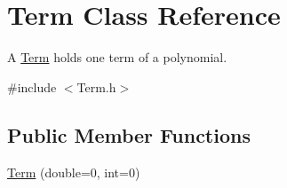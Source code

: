 \hypertarget{classTerm}{\section{Term Class Reference}
\label{classTerm}
}


A \hyperlink{classTerm}{Term} holds one term of a polynomial.  




{\ttfamily \#include $<$Term.\-h$>$}

\subsection*{Public Member Functions}
\begin{DoxyCompactItemize}
\item 
\hypertarget{classTerm_aa72ef129269040b50836346dcae32154}{\hyperlink{classTerm_aa72ef129269040b50836346dcae32154}{Term} (double=0, int=0)}\label{classTerm_aa72ef129269040b50836346dcae32154}


\end{DoxyCompactItemize}
